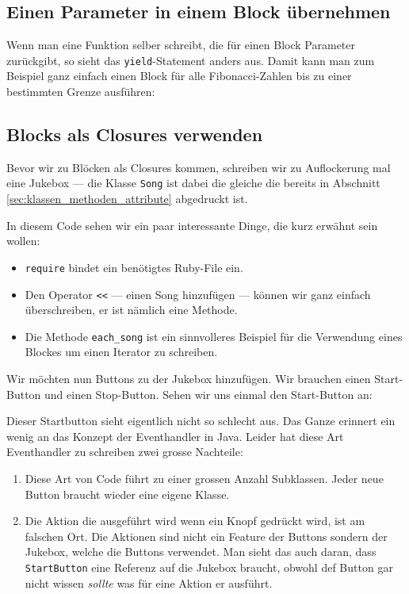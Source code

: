 \documentclass[a4book,11pt,twoside]{scrbook}
\begin{document}
\subsection*{Einen Parameter in einem Block übernehmen} %
\label{sub:subsection_name}
Wenn man eine Funktion selber schreibt, die für einen Block Parameter zurückgibt, so sieht das \texttt{yield}-Statement anders aus. Damit kann man zum Beispiel ganz einfach einen Block für alle Fibonacci-Zahlen bis zu einer bestimmten Grenze ausführen:




\subsection*{Blocks als Closures verwenden} %
\label{sub:blocks_als_closures_verwenden}
Bevor wir zu Blöcken als Closures kommen, schreiben wir  zu Auflockerung mal eine Jukebox — die Klasse \texttt{Song} ist dabei die gleiche die bereits in Abschnitt \ref{sec:klassen_methoden_attribute} abgedruckt ist.



In diesem Code sehen wir ein paar interessante Dinge, die kurz erwähnt sein wollen:

\begin{itemize}
	\item \texttt{require} bindet ein benötigtes Ruby-File ein.
	\item Den Operator \texttt{<<} — einen Song hinzufügen — können wir ganz einfach überschreiben, er ist nämlich eine Methode.
	\item Die Methode \texttt{each\_song} ist ein sinnvolleres Beispiel für die Verwendung eines Blockes um einen Iterator zu schreiben.
\end{itemize}

Wir möchten nun Buttons zu der Jukebox hinzufügen. Wir brauchen einen Start-Button und einen Stop-Button. Sehen wir uns einmal den Start-Button an:





Dieser Startbutton sieht eigentlich nicht so schlecht aus. Das Ganze erinnert ein wenig an das Konzept der Eventhandler in Java. Leider hat diese Art Eventhandler zu schreiben zwei grosse Nachteile:
\begin{enumerate}
	\item Diese Art von Code führt zu einer grossen Anzahl Subklassen. Jeder neue Button braucht wieder eine eigene Klasse.
	\item Die Aktion die ausgeführt wird wenn ein Knopf gedrückt wird, ist am falschen Ort. Die Aktionen sind nicht ein Feature der Buttons sondern der Jukebox, welche die Buttons verwendet. Man sieht das auch daran, dass \texttt{StartButton} eine Referenz auf die Jukebox braucht, obwohl def Button gar nicht wissen \emph{sollte} was für eine Aktion er ausführt.
\end{enumerate}
\end{document}
